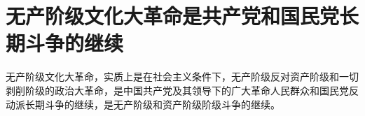 \section[无产阶级文化大革命是共产党和国民党长期斗争的继续（一九六八年三月）]{无产阶级文化大革命是共产党和国民党长期斗争的继续}


无产阶级文化大革命，实质上是在社会主义条件下，无产阶级反对资产阶级和一切剥削阶级的政治大革命，是中国共产党及其领导下的广大革命人民群众和国民党反动派长期斗争的继续，是无产阶级和资产阶级阶级斗争的继续。



